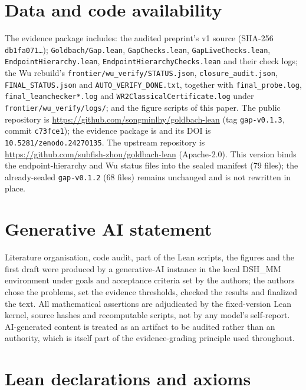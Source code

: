 \documentclass[11pt,a4paper]{article}
\theoremstyle{plain}
\theoremstyle{definition}
\begin{document}
\section*{Data and code availability}
{\raggedright
The evidence package includes: the audited preprint's v1 source (SHA-256 \texttt{db1fa071\ldots}); \texttt{Goldbach/Gap.lean}, \texttt{GapChecks.lean}, \texttt{GapLiveChecks.lean}, \texttt{EndpointHierarchy.lean}, \texttt{EndpointHierarchyChecks.lean} and their check logs; the Wu rebuild's \texttt{frontier/wu\_verify/STATUS.json}, \texttt{closure\_audit.json}, \texttt{FINAL\_STATUS.json} and \texttt{AUTO\_VERIFY\_DONE.txt}, together with \texttt{final\_probe.log}, \texttt{final\_leanchecker*.log} and \texttt{WR2ClassicalCertificate.log} under \texttt{frontier/wu\_verify/logs/}; and the figure scripts of this paper. The public repository is \url{https://github.com/songminlhy/goldbach-lean} (tag \texttt{gap-v0.1.3}, commit \texttt{c73fce1}); the evidence package is \cite{evidence} and its DOI is \texttt{10.5281/zenodo.24270135}. The upstream repository is \url{https://github.com/subfish-zhou/goldbach-lean} (Apache-2.0). This version binds the endpoint-hierarchy and Wu status files into the sealed manifest (79 files); the already-sealed \texttt{gap-v0.1.2} (68 files) remains unchanged and is not rewritten in place.
\par}

\section*{Generative AI statement}
Literature organisation, code audit, part of the Lean scripts, the figures and the first draft were produced by a generative-AI instance in the local DSH\_MM environment under goals and acceptance criteria set by the authors; the authors chose the problems, set the evidence thresholds, checked the results and finalized the text. All mathematical assertions are adjudicated by the fixed-version Lean kernel, source hashes and recomputable scripts, not by any model's self-report. AI-generated content is treated as an artifact to be audited rather than an authority, which is itself part of the evidence-grading principle used throughout.

\appendix

\section{Lean declarations and axioms}
\label{app:lean}
\end{document}
